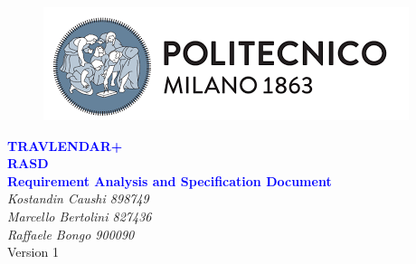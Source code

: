 


	\begin{titlepage}
		\centering
		\begin{figure}
			\vspace*{0mm}
			\centering
			\includegraphics[scale=0.7]{Images/Polimi_Logo}
			\\[3cm]
		\end{figure}		
		\vspace{65mm}
		\textcolor{Blue}{\textbf{\Huge TRAVLENDAR+}}\\[10mm]
		\textcolor{Blue}{\textbf{\huge RASD}}\\[4mm]
		{\textcolor{Blue}{\textbf{\Large{Requirement Analysis and Specification Document}}}}\\
		\vspace{30mm}
		\textit{\large Kostandin Caushi 898749}\\[3mm]
		\textit{\large Marcello Bertolini 827436}\\[3mm]
		\textit{\large Raffaele Bongo 900090}\\[3mm]
		\vspace{50mm}
		Version 1
	\end{titlepage}

	\begin{center}
	\vspace*{-5mm}
	\tableofcontents
	\newpage
    \end{center}
	
	\ttfamily
	
	\newpage
	

